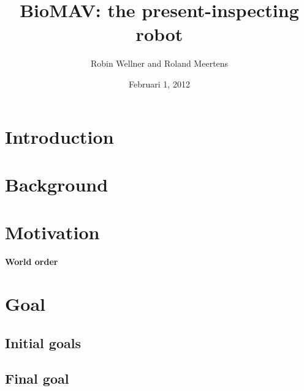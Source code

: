 \documentclass[a4paper,10pt]{article}
\begin{document}
\title{BioMAV: the present-inspecting robot}

\author{Robin Wellner and Roland Meertens}

\date{Februari 1, 2012}

\maketitle

\section{Introduction}

\section{Background}


\section{Motivation}
\textbf{World order}
\section{Goal}
\subsection{Initial goals}

\subsection{Final goal}
\end{document}

